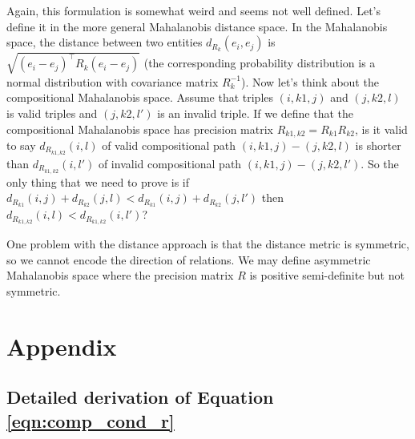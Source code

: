 \documentclass{article}
\begin{document}
Again, this formulation is somewhat weird and seems not well defined. Let's define it in the more general Mahalanobis distance space. In the Mahalanobis space, the distance between two entities $d_{R_k}(e_i, e_j)$ is $\sqrt{(e_i-e_j)^\top R_k (e_i - e_j)}$ (the corresponding probability distribution is a normal distribution with covariance matrix $R_k^{-1}$). 
Now let's think about the compositional Mahalanobis space. Assume that triples $(i, k1, j)$ and $(j, k2, l)$ is valid triples and $(j, k2, l')$ is an invalid triple. If we define that the compositional Mahalanobis space has precision matrix $R_{k1,k2} = R_{k1} R_{k2}$, is it valid to say $d_{R_{k1,k2}}(i, l)$  of valid compositional path $(i, k1, j) - (j, k2, l)$ is shorter than $d_{R_{k1,k2}}(i, l')$ of invalid compositional path $(i, k1, j)-(j, k2, l')$. So the only thing that we need to prove is if $d_{R_{k1}}(i, j) + d_{R_{k2}}(j, l) < d_{R_{k1}}(i, j) + d_{R_{k2}}(j, l')$ then $d_{R_{k1,k2}}(i, l) < d_{R_{k1,k2}}(i, l')$?

One problem with the distance approach is that the distance metric is symmetric, so we cannot encode the direction of relations. We may define asymmetric Mahalanobis space where the precision matrix $R$ is positive semi-definite but not symmetric.





\section*{Appendix}
\subsection*{Detailed derivation of Equation \ref{eqn:comp_cond_r}}
\end{document}
